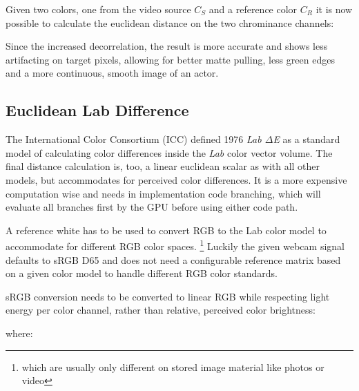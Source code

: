 Given two colors, one from the video source $C_S$ and a reference color $C_R$ 
it is now possible to calculate the euclidean distance on the two chrominance 
channels:


Since the increased decorrelation, the result is more accurate and shows less 
artifacting on target pixels, allowing for better matte pulling, less 
green edges and a more continuous, smooth image of an actor.

\subsection{Euclidean Lab Difference}
The International Color Consortium (ICC) defined 1976 \textit{Lab $\Delta$E} as 
a standard model of calculating color differences inside the \textit{Lab} color 
vector volume. The final distance calculation is, too, a linear euclidean 
scalar as with all other models, but accommodates for perceived color 
differences. It is a more expensive computation wise and needs in 
implementation code branching, which will evaluate all branches first by the 
GPU before using either code path.

A reference white has to be used to convert RGB to the Lab color model to 
accommodate for different RGB color spaces. \footnote{which are usually only 
different on stored image material like photos or video} Luckily the given 
webcam signal defaults to sRGB D65 and does not need a configurable reference 
matrix based on a given color model to handle different RGB color standards.

sRGB conversion needs to be converted to linear RGB while respecting light 
energy per color channel, rather than relative, perceived color brightness: 


where: 


